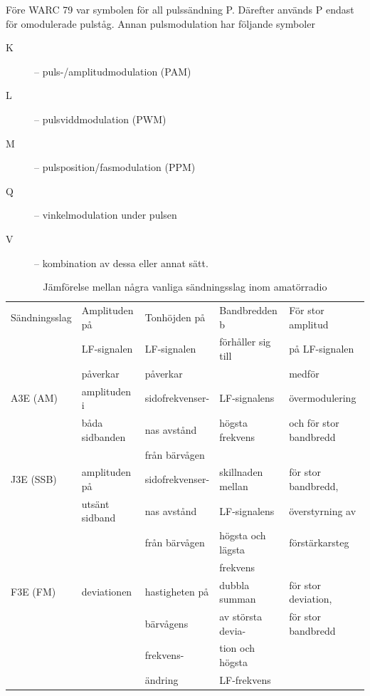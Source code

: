 Före WARC 79 var symbolen för all pulssändning P.
Därefter används P endast för omodulerade pulståg.
Annan pulsmodulation har följande symboler

\begin{description}
\item[K] -- puls-/amplitudmodulation (PAM)
\item[L] -- pulsviddmodulation (PWM)
\item[M] -- pulsposition/fasmodulation (PPM)
\item[Q] -- vinkelmodulation under pulsen
\item[V] -- kombination av dessa eller annat sätt.
\end{description}

\begin{table}[ht]
\begin{center}
\begin{tabular}{|l|l|l|l|l|}
\hline
Sändningsslag & Amplituden på & Tonhöjden på & Bandbredden b      & För stor amplitud \\
              & LF-signalen   & LF-signalen  & förhåller sig till & på LF-signalen \\
              & påverkar      & påverkar     &                    & medför \\ \hline
A3E (AM) & amplituden i   & sidofrekvenser- & LF-signalens    & övermodulering \\
         & båda sidbanden & nas avstånd    & högsta frekvens & och för stor bandbredd \\
         &                & från bärvågen  & & \\
J3E (SSB)& amplituden på  & sidofrekvenser- & skillnaden mellan & för stor bandbredd,\\
         & utsänt sidband & nas avstånd    & LF-signalens      & överstyrning av\\
         &                & från bärvågen  & högsta och lägsta & förstärkarsteg\\
         &                &                & frekvens          & \\
F3E (FM) & deviationen    & hastigheten på & dubbla summan     & för stor deviation,\\
         &                & bärvågens      & av största devia- & för stor bandbredd\\
         &                & frekvens-      & tion och högsta   & \\
         &                & ändring        & LF-frekvens       & \\ \hline
\end{tabular}
\end{center}
\caption{Jämförelse mellan några vanliga sändningsslag inom amatörradio}
\end{table}

